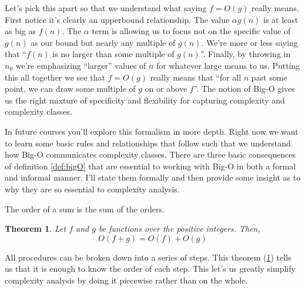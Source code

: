 \documentclass[]{tufte-handout}
\newtheorem{theorem}{Theorem}
\begin{document}
Let's pick this apart so that we understand what saying $f = O(g)$ really means. First notice it's clearly an upperbound relationship. The value $\alpha g(n)$ is at least as big as $f(n)$. The $\alpha$ term is allowing us to focus not on the specific value of $g(n)$ as our bound but nearly any multiple of $g(n)$.  We're more or less saying that ``$f(n)$ is no larger than some multiple of $g(n)$''.  Finally, by throwing in $n_0$ we're emphasizing ``larger'' values of $n$ for whatever large means to us. Putting this all together we see that $f = O(g)$ really means that ``for all $n$ past some point, we can draw some multiple\sidenote{$\alpha$} of $g$ on or above $f$''.  The notion of Big-O gives us the right mixture of specificity and flexibility for capturing complexity and complexity classes.   

In future courses you'll explore this formalism in more depth. Right now we want to learn some basic rules and relationships that follow such that we understand how Big-O communicates complexity classes. There are three basic consequences of definition \ref{def:bigO} that are essential to working with Big-O in both a formal and informal manner. I'll state them formally and then provide some insight as to why they are so essential to complexity analysis.

The order of a sum is the sum of the orders. 
\begin{theorem}
Let $f$ and $g$ be functions over the positive integers. Then,
\[
O(f + g) = O(f) + O(g)
\]
\label{th:sum}
\end{theorem}
All procedures can be broken down into a series of steps. This theorem (\ref{th:sum}) tells us that it is enough to know the order of each step. This let's us greatly simplify complexity analysis by doing it piecewise rather than on the whole. 
\end{document}
